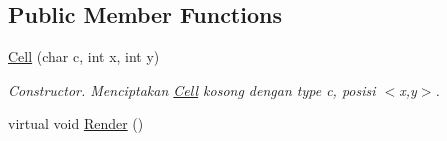 \subsection*{Public Member Functions}
\begin{DoxyCompactItemize}
\item 
\hyperlink{classCell_a7025ace286306aa5b6e09ccf43ac3451}{Cell} (char c, int x, int y)
\begin{DoxyCompactList}\small\item\em Constructor. Menciptakan \hyperlink{classCell}{Cell} kosong dengan type c, posisi $<$x,y$>$. \end{DoxyCompactList}\item 
virtual void \hyperlink{classCell_a6abd6c362b1b97636dd55ba46609c873}{Render} ()\hypertarget{classCell_a6abd6c362b1b97636dd55ba46609c873}{}\label{classCell_a6abd6c362b1b97636dd55ba46609c873}


\end{DoxyCompactItemize}
